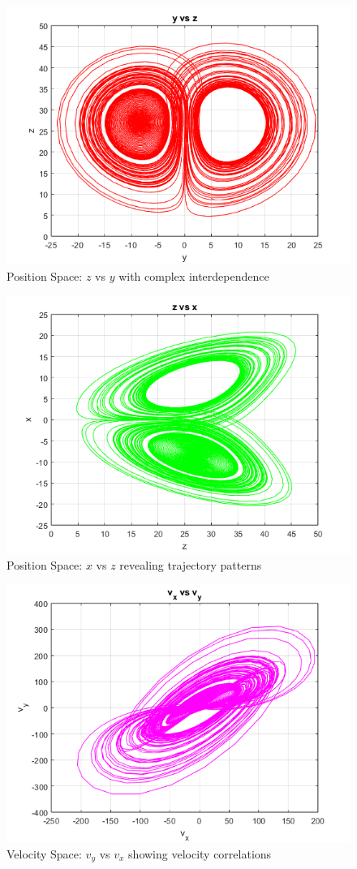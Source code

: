 \documentclass[%
reprint,
amsmath,amssymb,
aps,
floatfix,
]{revtex4-2}
\begin{document}
	\begin{figure}[htbp]
		\centering
		\includegraphics[width=0.8\linewidth]{z_vs_y.png}
		\caption{Position Space: $z$ vs $y$ with complex interdependence}
		\label{fig:z_y}
	\end{figure}
	
	\begin{figure}[htbp]
		\centering
		\includegraphics[width=0.8\linewidth]{x_vs_z.png}
		\caption{Position Space: $x$ vs $z$ revealing trajectory patterns}
		\label{fig:x_z}
	\end{figure}
	
	\begin{figure}[htbp]
		\centering
		\includegraphics[width=0.8\linewidth]{vy_vs_vx.png}
		\caption{Velocity Space: $v_y$ vs $v_x$ showing velocity correlations}
		\label{fig:vy_vx}
	\end{figure}
	
\end{document}
